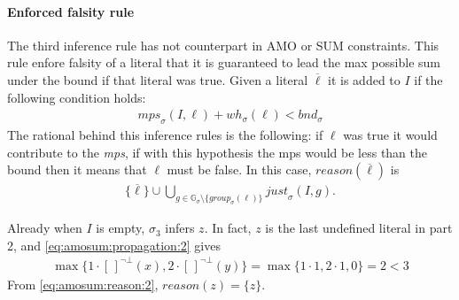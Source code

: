\paragraph{Enforced falsity rule}
The third inference rule has not counterpart in AMO or SUM constraints.
This rule enfore falsity of a literal that it is guaranteed to lead the max possible 
sum under the bound if that literal was true.
Given a literal $\overline{\ell}$ it is added to $I$ if the following condition holds:
\begin{align}\label{eq:amosum:propagation:3}
    \mathit{mps}_{\sigma}(I,\ell) + \mathit{wh}_\sigma(\ell) < \mathit{bnd}_\sigma
\end{align}
The rational behind this inference rules is the following: if $\ell$ was true it would 
contribute to the \textit{mps}, if with this hypothesis the mps would be less than the bound then 
it means that $\ell$ must be false.
In this case, $\mathit{reason}(\overline{\ell})$ is
\begin{align}\label{eq:amosum:reason:3}
\{\overline{\ell}\} \cup \bigcup_{g \in \mathbb{G}_\sigma \setminus \{\mathit{group}_\sigma(\ell)\}}{
    \mathit{just}_\sigma(I,g)
}.
\end{align}

\begin{example}\label{ex:amosum:propagation:2}
    Already when $I$ is empty, $\sigma_3$ infers $z$.
    In fact, $z$ is the last undefined literal in part 2, and \eqref{eq:amosum:propagation:2} gives
    \begin{align*}
         \max\{1 \cdot [\,]^{\neg\bot}(x), 2 \cdot [\,]^{{\neg\bot}}(y)\} = \max\{1 \cdot 1, 2 \cdot 1,0\} = 2 < 3
    \end{align*}
From \eqref{eq:amosum:reason:2},
$\mathit{reason}(z) = \{z\}$.
\end{example}

